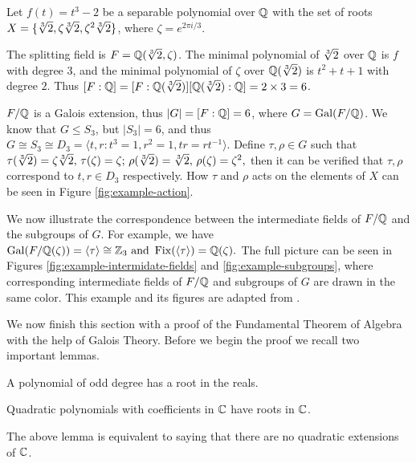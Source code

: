 \begin{example} \label{exm:correspondence}
	
	Let $f(t) = t^3 - 2$ be a separable polynomial over $\mathbb Q$ with the set of roots $X = \{ \sqrt[3]{2}, \zeta \sqrt[3]{2}, \zeta^2 \sqrt[3]{2} \}$, where $\zeta = e^{2\pi i / 3}$. 
	
	The splitting field is $F = \mathbb Q(\sqrt[3]{2}, \zeta)$. The minimal polynomial of $\sqrt[3]{2}$ over $\mathbb Q$ is $f$ with degree $3$, and the minimal polynomial of $\zeta$ over $\mathbb Q(\sqrt[3]{2})$ is $t^2 + t + 1$ with degree $2$. Thus $[F : \mathbb Q] = [F : \mathbb Q(\sqrt[3]{2})] [\mathbb Q(\sqrt[3]{2}) : \mathbb Q] = 2 \times 3 = 6$. 
	
	$F / \mathbb Q$ is a Galois extension, thus $|G| = [F : \mathbb Q] = 6$, where $G = \operatorname{Gal}(F / \mathbb Q)$. We know that $G \le S_3$, but $|S_3| = 6$, and thus $G \cong S_3 \cong D_3 = \langle t, r : t^3 = 1, r^2 = 1, tr = rt^{-1} \rangle$. Define $\tau, \rho \in G$ such that 
	$
		\tau(\sqrt[3]{2}) = \zeta \sqrt[3]{2}, \, \tau(\zeta) = \zeta; \, \rho(\sqrt[3]{2}) = \sqrt[3]{2}, \,  \rho(\zeta) = \zeta ^ 2,
	$
	then it can be verified that $\tau, \rho$ correspond to $t, r \in D_3$ respectively. How $\tau$ and $\rho$ acts on the elements of $X$ can be seen in Figure \ref{fig:example-action}.
	
	We now illustrate the correspondence between the intermediate fields of $F / \mathbb Q$ and the subgroups of $G$. For example, we have $\operatorname{Gal}(F / \mathbb Q(\zeta)) = \langle \tau \rangle \cong \mathbb Z_3 \text{ and } \operatorname{Fix}(\langle \tau \rangle) = \mathbb Q(\zeta). $ The full picture can be seen in Figures \ref{fig:example-intermidate-fields} and \ref{fig:example-subgroups}, where corresponding intermediate fields of $F / \mathbb Q$ and subgroups of $G$ are drawn in the same color. This example and its figures are adapted from \cite{visual-algebra}. 
	
\end{example}

We now finish this section with a proof of the Fundamental Theorem of Algebra with the help of Galois Theory. Before we begin the proof we recall two important lemmas.

\begin{lemma}\label{lemma:ood-degree-real-root}
    A polynomial of odd degree has a root in the reals.
\end{lemma}

\begin{lemma}\label{lemma:quadratic-extension-in-C}
    Quadratic polynomials with coefficients in $\mathbb C$ have roots in $\mathbb C$.
\end{lemma}

The above lemma is equivalent to saying that there are no quadratic extensions of $\mathbb C$.

